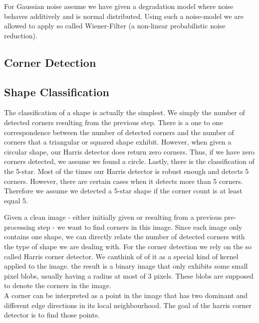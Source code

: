 \documentclass[conference]{IEEEtran}
\begin{document}
For Gaussian noise assume we have given a degradation model where noise behaves additively and is normal distributed. Using such a noise-model we are allowed to apply so called Wiener-Filter (a non-linear probabilistic noise reduction). 

\subsection{Corner Detection}

\subsection{Shape Classification}
The classification of a shape is actually the simplest. We simply the number of detected corners resulting from the previous step. There is a one to one correspondence between the number of detected corners and the number of corners that a triangular or squared shape exhibit. However, when given a circular shape, our Harris detector does return zero corners. Thus, if we have zero corners detected, we assume we found a circle. Lastly, there is the classification of the 5-star. Most of the times our Harris detector is robust enough and detects 5 corners. However, there are certain cases when it detects more than 5 corners. Therefore we assume we detected a 5-star shape if the corner count is at least equal 5.


\label{sub:corner_detection}
Given a clean image - either initially given or resulting from a previous pre-processing step - we want to find corners in this image. Since each image only contains one shape, we can directly relate the number of detected corners with the type of shape we are dealing with. For the corner detection we rely on the so called Harris corner detector. We canthink of of it as a special kind of kernel applied to the image. the result is a binary image that only exhibits some small pixel blobs, usually having a radius at most of 3 pixels. These blobs are supposed to denote the corners in the image. \\ 

A corner can be interpreted as a point in the image that has two dominant and different edge directions in its local neighbourhood. The goal of the harris corner detector is to find those points. \\
\end{document}
